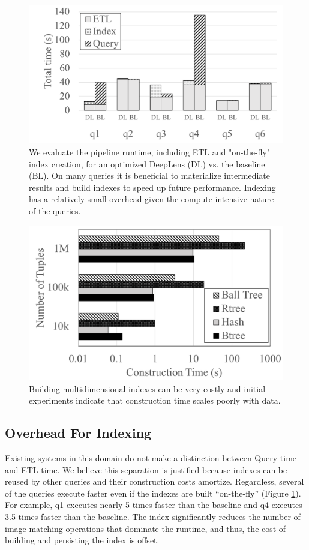 \begin{figure}[t]
\centering
 \includegraphics[width=\columnwidth]{figures/indexing_ab.png}
 \caption{We evaluate the pipeline runtime, including ETL and "on-the-fly" index creation, for an optimized \textsf{DeepLens} (DL) vs. the baseline (BL). On many queries it is beneficial to materialize intermediate results and build indexes to speed up future performance. Indexing has a relatively small overhead given the compute-intensive nature of the queries.  \label{index} }
\end{figure}

\begin{figure}[t]
\centering
 \includegraphics[width=0.8\columnwidth]{figures/indexing.png}
 \caption{Building multidimensional indexes can be very costly and initial experiments indicate that construction time scales poorly with data. \label{indexbuild} }
\end{figure}

\subsection{Overhead For Indexing}
Existing systems in this domain do not make a distinction between Query time and ETL time.
We believe this separation is justified because indexes can be reused by other queries and their construction costs amortize.
Regardless, several of the queries execute faster even if the indexes are built ``on-the-fly'' (Figure \ref{index}).
For example, q1 executes nearly 5 times faster than the baseline and q4 executes 3.5 times faster than the baseline.
The index significantly reduces the number of image matching operations that dominate the runtime, and thus, the cost of building and persisting the index is offset.

